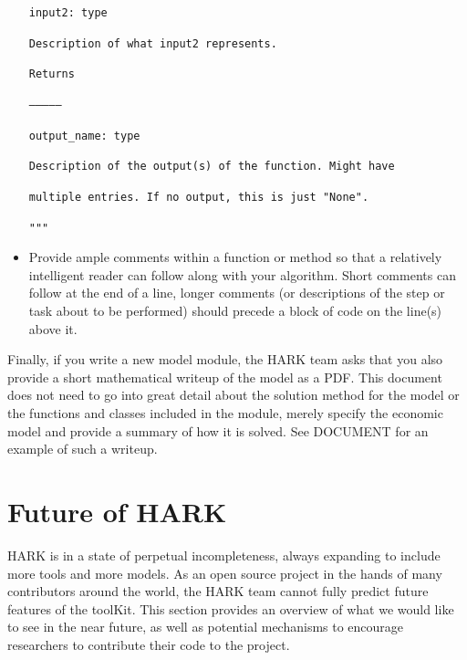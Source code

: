 \documentclass[12pt,titlepage,letterpaper]{econtex}
\begin{document}
\begin{itemize}
\hspace{0.9cm}\texttt{input2: type}

\hspace{1.8cm}\texttt{Description of what input2 represents.}

\vspace{0.5cm}

\hspace{0.9cm}\texttt{Returns}

\hspace{0.9cm}\texttt{--------------}

\hspace{0.9cm}\texttt{output\_name: type}

\hspace{1.8cm}\texttt{Description of the output(s) of the function.  Might have}

\hspace{1.8cm}\texttt{multiple entries.  If no output, this is just "None".}  

\hspace{0.9cm}\texttt{"""}

\item Provide ample comments within a function or method so that a relatively intelligent reader can follow along with your algorithm.  Short comments can follow at the end of a line, longer comments (or descriptions of the step or task about to be performed) should precede a block of code on the line(s) above it.
\end{itemize}

Finally, if you write a new model module, the HARK team asks that you also provide a short mathematical writeup of the model as a PDF.  This document does not need to go into great detail about the solution method for the model or the functions and classes included in the module, merely specify the economic model and provide a summary of how it is solved.  See DOCUMENT for an example of such a writeup.

\section{Future of HARK}\label{sec:FutureOfHARK}

HARK is in a state of perpetual incompleteness, always expanding to include more tools and more models.  As an open source project in the hands of many contributors around the world, the HARK team cannot fully predict future features of the toolKit.  This section provides an overview of what we would like to see in the near future, as well as potential mechanisms to encourage researchers to contribute their code to the project.
\end{document}
